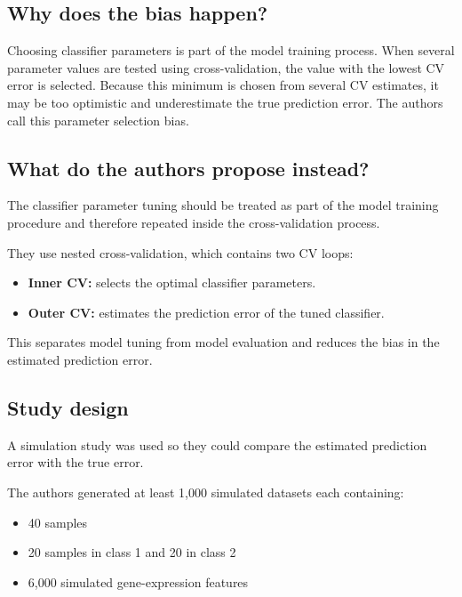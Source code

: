\documentclass[
  letterpaper,
  DIV=11,
  numbers=noendperiod]{scrreprt}
\providecommand{\tightlist}{%
  \setlength{\itemsep}{0pt}\setlength{\parskip}{0pt}}
\begin{document}
\subsection{Why does the bias happen?}\label{why-does-the-bias-happen}

Choosing classifier parameters is part of the model training process.
When several parameter values are tested using cross-validation, the
value with the lowest CV error is selected. Because this minimum is
chosen from several CV estimates, it may be too optimistic and
underestimate the true prediction error. The authors call this parameter
selection bias.

\subsection{What do the authors propose
instead?}\label{what-do-the-authors-propose-instead}

The classifier parameter tuning should be treated as part of the model
training procedure and therefore repeated inside the cross-validation
process.

They use nested cross-validation, which contains two CV loops:

\begin{itemize}
\tightlist
\item
  \textbf{Inner CV:} selects the optimal classifier parameters.
\item
  \textbf{Outer CV:} estimates the prediction error of the tuned
  classifier.
\end{itemize}

This separates model tuning from model evaluation and reduces the bias
in the estimated prediction error.

\subsection{Study design}\label{study-design}

A simulation study was used so they could compare the estimated
prediction error with the true error.

The authors generated at least 1,000 simulated datasets each containing:

\begin{itemize}
\tightlist
\item
  40 samples
\item
  20 samples in class 1 and 20 in class 2
\item
  6,000 simulated gene-expression features
\end{itemize}
\end{document}
